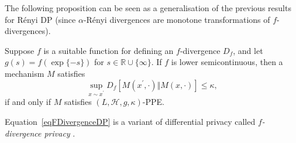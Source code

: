 \documentclass{article}
\theoremstyle{plain}
\theoremstyle{plain}
\theoremstyle{definition}
\theoremstyle{remark}
\theoremstyle{plain}
\begin{document}
The following proposition can be seen as a generalisation of the previous results for R\'{e}nyi DP (since $\alpha$-R\'enyi divergences are monotone transformations of $f$-divergences).

\begin{proposition}\label{prop:fdp2ppe}
    Suppose $f$ is a suitable function for defining an $f$-divergence $D_f$, and let $g(s) = f(\exp\{-s\})$ for $s\in \mathbb{R} \cup \{\infty\}$. If $f$ is lower semicontinuous, then a mechanism $M$ satisfies
    \begin{equation}\label{eqFDivergenceDP}
        \sup_{x\sim x^\prime} D_f[M(x^\prime,\cdot) \Vert M(x,\cdot)] \leq \kappa,
    \end{equation}
    if and only if $M$ satisfies $(L,\mathcal{H},g,\kappa)$-PPE.
\end{proposition}

Equation~\ref{eqFDivergenceDP} is a variant of differential privacy called \emph{$f$-divergence privacy} \citep{barberPrivacyStatisticalRisk2014, bartheDifferentialPrivacyComposition2013}.
\end{document}
